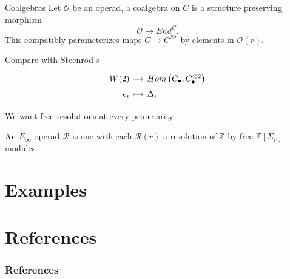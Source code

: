 \documentclass[10pt,t]{beamer}
\begin{document}
\begin{frame}[fragile]{Coalgebras}
	Let $\mathcal O$ be an operad, a coalgebra on $C$ is a structure preserving morphism
	\begin{equation*}
	\mathcal O \to End^C.
	\end{equation*}
	This compatibly parameterizes maps $C \to C^{\otimes r}$ by elements in $\mathcal O(r)$.
	
	\pause \vspace*{10pt}
	
	Compare with Steenrod's
	\vspace*{-2pt}
	\begin{equation*}
	\begin{tikzcd}[%
	row sep=tiny,
	column sep = small,
	,row sep = 0ex
	,/tikz/column 1/.append style={anchor=base east}
	,/tikz/column 2/.append style={anchor=base west}
	]
	W(2) \arrow[r] & Hom\left(C_\bullet, C_\bullet^{\otimes 2}\right) \\
	e_i \arrow[r, |->] & \Delta_i
	\end{tikzcd}
	\end{equation*}
	
	\pause
	We want free resolutions at every prime arity.
	
	\begin{definition}
		An $E_\infty$-operad $\mathcal R$ is one with each $\mathcal R(r)$ a resolution of $\mathbb Z$ by free $\mathbb Z[\Sigma_r]$-modules
	\end{definition}
	
\end{frame}

\section{Examples}

\section*{References}

\begin{frame}%
	\frametitle{References}
	\nocite{whitney1935history}
	
	
\end{frame}
\end{document}
